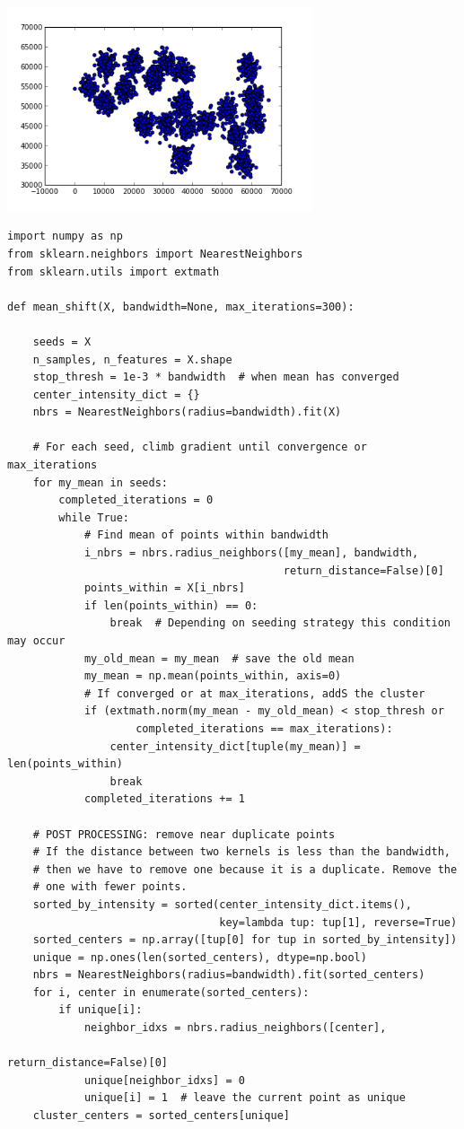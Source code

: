 \documentclass[12pt,fleqn]{article}\usepackage{../common}
\begin{document}
\includegraphics[height=6cm]{meanshift_1.png}
\begin{verbatim}
import numpy as np
from sklearn.neighbors import NearestNeighbors
from sklearn.utils import extmath

def mean_shift(X, bandwidth=None, max_iterations=300):
    
    seeds = X
    n_samples, n_features = X.shape
    stop_thresh = 1e-3 * bandwidth  # when mean has converged
    center_intensity_dict = {}
    nbrs = NearestNeighbors(radius=bandwidth).fit(X)

    # For each seed, climb gradient until convergence or max_iterations
    for my_mean in seeds:
        completed_iterations = 0
        while True:
            # Find mean of points within bandwidth
            i_nbrs = nbrs.radius_neighbors([my_mean], bandwidth,
                                           return_distance=False)[0]
            points_within = X[i_nbrs]
            if len(points_within) == 0:
                break  # Depending on seeding strategy this condition may occur
            my_old_mean = my_mean  # save the old mean
            my_mean = np.mean(points_within, axis=0)
            # If converged or at max_iterations, addS the cluster
            if (extmath.norm(my_mean - my_old_mean) < stop_thresh or
                    completed_iterations == max_iterations):
                center_intensity_dict[tuple(my_mean)] = len(points_within)
                break
            completed_iterations += 1

    # POST PROCESSING: remove near duplicate points
    # If the distance between two kernels is less than the bandwidth,
    # then we have to remove one because it is a duplicate. Remove the
    # one with fewer points.
    sorted_by_intensity = sorted(center_intensity_dict.items(),
                                 key=lambda tup: tup[1], reverse=True)
    sorted_centers = np.array([tup[0] for tup in sorted_by_intensity])
    unique = np.ones(len(sorted_centers), dtype=np.bool)
    nbrs = NearestNeighbors(radius=bandwidth).fit(sorted_centers)
    for i, center in enumerate(sorted_centers):
        if unique[i]:
            neighbor_idxs = nbrs.radius_neighbors([center],
                                                  return_distance=False)[0]
            unique[neighbor_idxs] = 0
            unique[i] = 1  # leave the current point as unique
    cluster_centers = sorted_centers[unique]


\end{verbatim}
\end{document}
